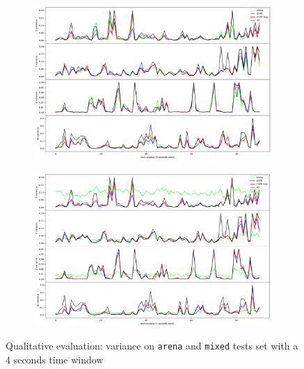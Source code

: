 \begin{figure}[!h]
	\begin{center}
		\begin{subfigure}[h]{0.49\textwidth}
			\centering
			\includegraphics[width=1\textwidth]{"contents/images/06-variance-arena"}
		\end{subfigure}
		\hfill
		\begin{subfigure}[h]{0.49\textwidth}
			\centering
			\includegraphics[width=1\textwidth]{"contents/images/06-variance-mixed"}
		\end{subfigure}
	\end{center}
	\vspace{-0.5cm}
	\caption[Qualitative evaluation: variance on \texttt{arena} and \texttt{mixed} tests set with a 4 seconds time window]{Qualitative evaluation: variance on \texttt{arena} and \texttt{mixed} tests set with a 4 seconds time window}
	\label{fig:ql-variance}
\end{figure}



